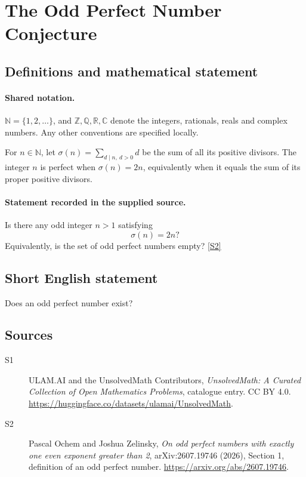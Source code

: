 \documentclass[11pt]{article}
\newcommand{\sref}[2]{\hyperlink{source:#1:#2}{[S#2]}}
\begin{document}
\section{The Odd Perfect Number Conjecture}\label{statement}

\subsection{Definitions and mathematical statement}

\paragraph{Shared notation.}$\mathbb N=\{1,2,\ldots\}$, and $\mathbb Z,\mathbb Q,\mathbb R,\mathbb C$ denote the integers, rationals, reals and complex numbers. Any other conventions are specified locally.


For \(n\in\mathbb N\), let
\(\sigma(n)=\sum_{d\mid n,\ d>0}d\) be the sum of all its positive
divisors.  The integer \(n\) is perfect when \(\sigma(n)=2n\),
equivalently when it equals the sum of its proper positive divisors.
\paragraph{Statement recorded in the supplied source.}
Is there any odd integer \(n>1\) satisfying
\[
 \sigma(n)=2n?
\]
Equivalently, is the set of odd perfect numbers empty? \sref{statement}{2}
\subsection{Short English statement}
Does an odd perfect number exist?
\subsection{Sources}
\begin{description}
\item[\hypertarget{source:statement:1}{S1}] ULAM.AI and the UnsolvedMath Contributors, \emph{UnsolvedMath: A Curated Collection of Open Mathematics Problems}, catalogue entry. CC BY 4.0. \url{https://huggingface.co/datasets/ulamai/UnsolvedMath}.
\item[\hypertarget{source:statement:2}{S2}] Pascal Ochem and Joshua Zelinsky, \emph{On odd perfect numbers with exactly one even exponent greater than 2}, arXiv:2607.19746 (2026), Section 1, definition of an odd perfect number. \url{https://arxiv.org/abs/2607.19746}.
\end{description}
\label{end:statement}
\end{document}
